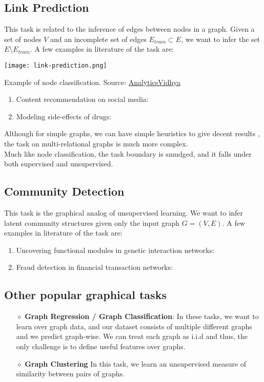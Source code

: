 \subsection{Link Prediction}
This task is related to the inference of edges between nodes in a graph. Given a set of nodes $V$ and an incomplete set of edges $E_{train} \subset E$, we want to infer the set $E \setminus E_{train}$. A few examples in literature of the task are:
\begin{marginfigure}
	\texttt{[image: link-prediction.png]}
	\caption{Example of node classification. Source: \href{https://www.analyticsvidhya.com/blog/2020/01/link-prediction-how-to-predict-your-future-connections-on-facebook/}{AnalyticsVidhya}}
	\label{fig:link-prediction}
\end{marginfigure}
\begin{enumerate}
	\item Content recommendation on social media: \cite{link-prediction-content}
	\item Modeling side-effects of drugs: \cite{link-prediction-side-effects}
\end{enumerate}
Although for simple graphs, we can have simple heuristics to give decent results \cite{link-prediction-survey-heuristic}, the task on multi-relational graphs is much more complex. \\
Much like node classification, the task boundary is smudged, and it falls under both supervised and unsupervised.
\subsection{Community Detection}
This task is the graphical analog of unsupervised learning. We want to infer latent community structures given only the input graph $G = (V, E)$. A few examples in literature of the task are:
\begin{enumerate}
	\item Uncovering functional modules in genetic interaction networks: \cite{community-detection-genetic}
	\item Fraud detection in financial transaction networks: \cite{community-detection-fraud}
\end{enumerate}
\subsection{Other popular graphical tasks}
\begin{itemize}
	\item[$\diamond$] \textbf{Graph Regression / Graph Classification}: In these tasks, we want to learn over graph data, and our dataset consists of multiple different graphs and we predict graph-wise. We can treat each graph as i.i.d and thus, the only challenge is to define useful features over graphs.
	\item[$\diamond$] \textbf{Graph Clustering} In this task, we learn an unsupervised measure of similarity between pairs of graphs.
\end{itemize}